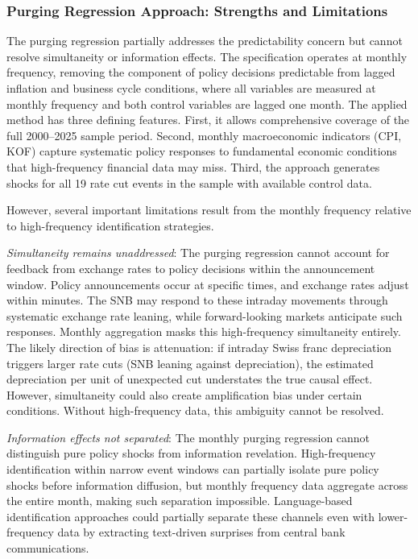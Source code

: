 \documentclass[12pt,a4paper]{article}
\begin{document}
\subsubsection{Purging Regression Approach: Strengths and Limitations}
The purging regression partially addresses the predictability concern but cannot resolve simultaneity or information effects. The specification operates at monthly frequency, removing the component of policy decisions predictable from lagged inflation and business cycle conditions, where all variables are measured at monthly frequency and both control variables are lagged one month.  The applied method has three defining features. First, it allows comprehensive coverage of the full 2000--2025 sample period. Second, monthly macroeconomic indicators (CPI, KOF) capture systematic policy responses to fundamental economic conditions that high-frequency financial data may miss. Third, the approach generates shocks for all 19 rate cut events in the sample with available control data.

However, several important limitations result from the monthly frequency relative to high-frequency identification strategies. 

\textit{Simultaneity remains unaddressed}: The purging regression cannot account for feedback from exchange rates to policy decisions within the announcement window. Policy announcements occur at specific times, and exchange rates adjust within minutes. The SNB may respond to these intraday movements through systematic exchange rate leaning, while forward-looking markets anticipate such responses. Monthly aggregation masks this high-frequency simultaneity entirely. The likely direction of bias is attenuation: if intraday Swiss franc depreciation triggers larger rate cuts (SNB leaning against depreciation), the estimated depreciation per unit of unexpected cut understates the true causal effect. However, simultaneity could also create amplification bias under certain conditions. Without high-frequency data, this ambiguity cannot be resolved.

\textit{Information effects not separated}: The monthly purging regression cannot distinguish pure policy shocks from information revelation. High-frequency identification within narrow event windows can partially isolate pure policy shocks before information diffusion, but monthly frequency data aggregate across the entire month, making such separation impossible. Language-based identification approaches could partially separate these channels even with lower-frequency data by extracting text-driven surprises from central bank communications.
\end{document}
